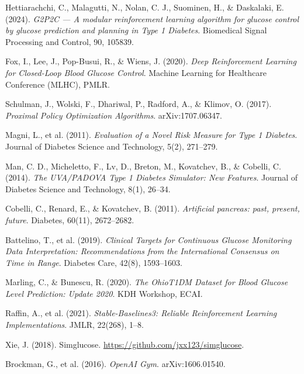 \documentclass[a4paper,12pt]{report}
\begin{document}
\begin{enumerate}[label={[\arabic*]}]
  \item Hettiarachchi, C., Malagutti, N., Nolan, C. J., Suominen, H., \& Daskalaki, E. (2024). \textit{G2P2C --- A modular reinforcement learning algorithm for glucose control by glucose prediction and planning in Type 1 Diabetes}. Biomedical Signal Processing and Control, 90, 105839.
  \item Fox, I., Lee, J., Pop-Busui, R., \& Wiens, J. (2020). \textit{Deep Reinforcement Learning for Closed-Loop Blood Glucose Control}. Machine Learning for Healthcare Conference (MLHC), PMLR.
  \item Schulman, J., Wolski, F., Dhariwal, P., Radford, A., \& Klimov, O. (2017). \textit{Proximal Policy Optimization Algorithms}. arXiv:1707.06347.
  \item Magni, L., et al. (2011). \textit{Evaluation of a Novel Risk Measure for Type 1 Diabetes}. Journal of Diabetes Science and Technology, 5(2), 271--279.
  \item Man, C. D., Micheletto, F., Lv, D., Breton, M., Kovatchev, B., \& Cobelli, C. (2014). \textit{The UVA/PADOVA Type 1 Diabetes Simulator: New Features}. Journal of Diabetes Science and Technology, 8(1), 26--34.
  \item Cobelli, C., Renard, E., \& Kovatchev, B. (2011). \textit{Artificial pancreas: past, present, future}. Diabetes, 60(11), 2672--2682.
  \item Battelino, T., et al. (2019). \textit{Clinical Targets for Continuous Glucose Monitoring Data Interpretation: Recommendations from the International Consensus on Time in Range}. Diabetes Care, 42(8), 1593--1603.
  \item Marling, C., \& Bunescu, R. (2020). \textit{The OhioT1DM Dataset for Blood Glucose Level Prediction: Update 2020}. KDH Workshop, ECAI.
  \item Raffin, A., et al. (2021). \textit{Stable-Baselines3: Reliable Reinforcement Learning Implementations}. JMLR, 22(268), 1--8.
  \item Xie, J. (2018). Simglucose. \url{https://github.com/jxx123/simglucose}.
  \item Brockman, G., et al. (2016). \textit{OpenAI Gym}. arXiv:1606.01540.
\end{enumerate}
\end{document}
